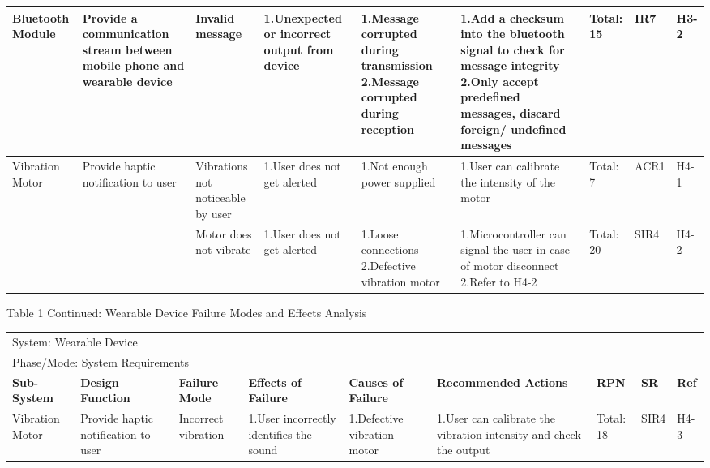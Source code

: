 \documentclass[12pt, titlepage]{article}
\begin{document}
\begin{landscape}
\begin{table}[H]
\begin{tabular}{| p{} | p{}  | p{} | p{} | p{} | p{} | p{} | p{} | p{} |}
        Bluetooth Module & Provide a communication stream between mobile phone and wearable device & Invalid message & 1.Unexpected or incorrect output from device & 1.Message corrupted during transmission \newline 2.Message corrupted during reception & 1.Add a checksum into the bluetooth signal to check for message integrity \newline 2.Only accept predefined messages, discard foreign/ undefined messages & Total: 15 & IR7 & H3-2 \\ \hline
         
        Vibration Motor & Provide haptic notification to user & Vibrations not noticeable by user & 1.User does not get alerted & 1.Not enough power supplied & 1.User can calibrate the intensity of the motor & Total: 7 & ACR1 & H4-1 \\ \cline{3-9}
    
         & & Motor does not vibrate & 1.User does not get alerted & 1.Loose connections \newline 2.Defective vibration motor  & 1.Microcontroller can signal the user in case of motor disconnect \newline 2.Refer to  H4-2  & Total: 20 & SIR4 & H4-2 \\ \cline{1-9}
     
        \end{tabular}

\end{table}

\begin{table}[H]
    \centering
        Table 1 Continued: Wearable Device Failure Modes and Effects Analysis

        \begin{tabular}{| p{} | p{}  | p{} | p{} | p{} | p{} | p{} | p{} | p{} |}
            \hline
        
        \multicolumn{9}{|l|}{System: Wearable Device} \\
        \multicolumn{9}{|l|}{Phase/Mode: System Requirements} \\ \hline
        \textbf{Sub-System} & \textbf{Design Function} & \textbf{Failure Mode} & \textbf{Effects of Failure} & \textbf{Causes of Failure} & \textbf{Recommended Actions} & \textbf{RPN} & \textbf{SR} & \textbf{Ref} \\ \hline
         
        Vibration Motor & Provide haptic notification to user &  Incorrect vibration & 1.User incorrectly identifies the sound & 1.Defective vibration motor & 1.User can calibrate the vibration intensity and check the output  & Total: 18 & SIR4 & H4-3 \\ \cline{3-9}
     

\end{tabular}
\end{table}
\end{landscape}
\end{document}
